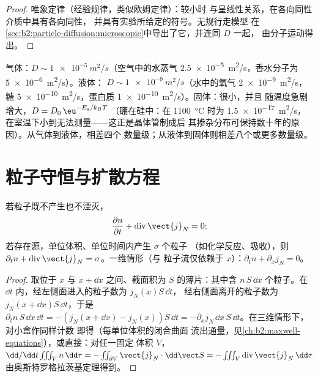 \begin{proof}
唯象定律（经验规律，类似欧姆定律）：较小时
与呈线性关系，在各向同性介质中具有各向同性，
并具有实验所给定的符号。无规行走模型
在\cref{sec:b2:particle-diffusion:microscopic}中导出了它，并连同 $D$ 一起，
由分子运动得出。
\end{proof}

\begin{example}[$D$ 的数量级]\label{ex:b2:particle-diffusion:orders}
气体：$D \sim \qty{1e-5}{m^2/s}$（空气中的水蒸气
\qty{2.5e-5}{m^2/s}，香水分子为 \qty{5e-6}{m^2/s}）。液体：
$D \sim \qty{1e-9}{m^2/s}$（水中的氧气 \qty{2e-9}{m^2/s}，糖
\qty{5e-10}{m^2/s}，蛋白质 \qty{1e-10}{m^2/s}）。固体：很小，并且
随温度急剧增大，$D = D_0\,\eu^{-E_{\text{a}}/k_BT}$
（硼在硅中：在 \qty{1100}{\celsius} 时为 \qty{1.5e-17}{m^2/s}，
在室温下小到无法测量——这正是晶体管制成后
其掺杂分布可保持数十年的原因）。从气体到液体，相差四个
数量级；从液体到固体则相差八个或更多数量级。
\end{example}

\section{粒子守恒与扩散方程}

\begin{theorem}[局域粒子数守恒]\label{thm:b2:particle-diffusion:balance}
若粒子既不产生也不湮灭，
\[
\frac{\partial n}{\partial t} + \operatorname{div}\vect{j}_N = 0 ;
\]
若存在源，单位体积、单位时间内产生 $\sigma$ 个粒子
（如化学反应、吸收），则 $\partial_t n +
\operatorname{div}\vect{j}_N = \sigma$。一维情形（与
粒子流仅依赖于 $x$）：$\partial_t n + \partial_x j_N = 0$。
\end{theorem}

\begin{proof}
取位于 $x$ 与 $x + \dd x$ 之间、截面积为 $S$ 的薄片：其中含
$n\,S\,\dd x$ 个粒子。在 $\dd t$ 内，经左侧面进入的粒子数为 $j_N(x)S\,\dd t$，
经右侧面离开的粒子数为 $j_N(x + \dd x)S\,\dd t$，于是
$\partial_t n\,S\,\dd x\,\dd t = -(j_N(x+\dd x) - j_N(x))S\,\dd t =
-\partial_x j_N\,\dd x\,S\,\dd t$。在三维情形下，对小盒作同样计数
即得（每单位体积的闭合曲面
流出通量，见\cref{ch:b2:maxwell-equations}），或直接：对任一固定
体积 $V$，$\dd/\dd t \iiint_V n\,\dd\tau = -\iint_{\partial V}
\vect{j}_N\cdot\dd\vect S = -\iiint_V \operatorname{div}\vect{j}_N\,\dd\tau$
由奥斯特罗格拉茨基定理得到。
\end{proof}

